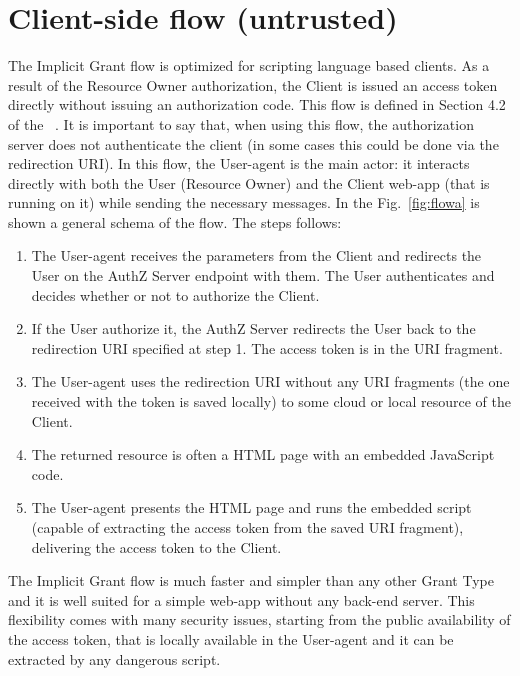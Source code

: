 \section{Client-side flow (untrusted)}
The Implicit Grant flow is optimized for scripting language based clients. As a result of the Resource Owner authorization, the Client is issued an access token directly without issuing an authorization code. This flow is defined in Section 4.2 of the \ \cite{RFC6749}. It is important to say that, when using this flow, the authorization server does not authenticate the client (in some cases this could be done via the redirection URI). In this flow, the User-agent is the main actor: it interacts directly with both the User (Resource Owner) and the Client web-app (that is running on it) while sending the necessary messages. In the Fig.~\ref{fig:flowa} is shown a general schema of the flow. The steps follows:

\begin{enumerate}
    \item The User-agent receives the parameters from the Client and redirects the User on the AuthZ Server endpoint with them. The User authenticates and decides whether or not to authorize the Client.
    
    \item If the User authorize it, the AuthZ Server redirects the User back to the redirection URI specified at step 1. The access token is in the URI fragment.
    
    \item The User-agent uses the redirection URI without any URI fragments (the one received with the token is saved locally) to some cloud or local resource of the Client.
    
    \item The returned resource is often a HTML page with an embedded JavaScript code.
    
    \item The User-agent presents the HTML page and runs the embedded script (capable of extracting the access token from the saved URI fragment), delivering the access token to the Client. 
\end{enumerate}

The Implicit Grant flow is much faster and simpler than any other Grant Type and it is well suited for a simple web-app without any back-end server. This flexibility comes with many security issues, starting from the public availability of the access token, that is locally available in the User-agent and it can be extracted by any dangerous script.

